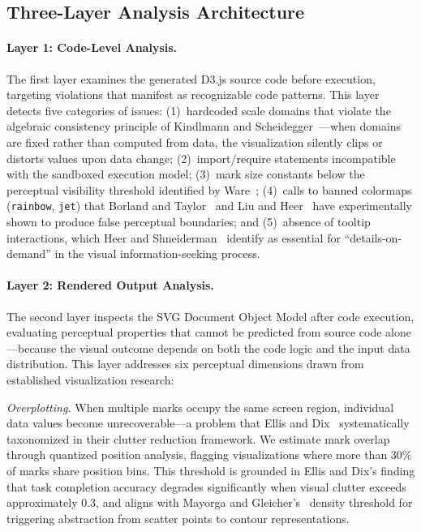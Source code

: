 \subsection{Three-Layer Analysis Architecture}

\paragraph{Layer 1: Code-Level Analysis.}
The first layer examines the generated D3.js source code before execution, targeting violations that manifest as recognizable code patterns. This layer detects five categories of issues: (1)~hardcoded scale domains that violate the algebraic consistency principle of Kindlmann and Scheidegger~\cite{kindlmann2014algebraic}---when domains are fixed rather than computed from data, the visualization silently clips or distorts values upon data change; (2)~import/require statements incompatible with the sandboxed execution model; (3)~mark size constants below the perceptual visibility threshold identified by Ware~\cite{ware2004information}; (4)~calls to banned colormaps (\texttt{rainbow}, \texttt{jet}) that Borland and Taylor~\cite{borland2007rainbow} and Liu and Heer~\cite{liu2018rainbow} have experimentally shown to produce false perceptual boundaries; and (5)~absence of tooltip interactions, which Heer and Shneiderman~\cite{heer2012interactive} identify as essential for ``details-on-demand'' in the visual information-seeking process.

\paragraph{Layer 2: Rendered Output Analysis.}
The second layer inspects the SVG Document Object Model after code execution, evaluating perceptual properties that cannot be predicted from source code alone---because the visual outcome depends on both the code logic and the input data distribution. This layer addresses six perceptual dimensions drawn from established visualization research:

\textit{Overplotting.} When multiple marks occupy the same screen region, individual data values become unrecoverable---a problem that Ellis and Dix~\cite{ellis2007clutter} systematically taxonomized in their clutter reduction framework. We estimate mark overlap through quantized position analysis, flagging visualizations where more than 30\% of marks share position bins. This threshold is grounded in Ellis and Dix's finding that task completion accuracy degrades significantly when visual clutter exceeds approximately 0.3, and aligns with Mayorga and Gleicher's~\cite{mayorga2013splatterplots} density threshold for triggering abstraction from scatter points to contour representations.

